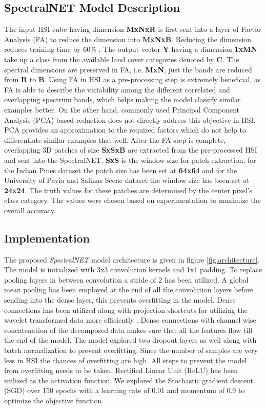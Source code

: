 \documentclass[journal]{IEEEtran}
\begin{document}
\subsection{SpectralNET Model Description}
The input HSI cube having dimension \textbf{MxNxR} is first sent into a layer of Factor Analysis (FA) to reduce the dimension into \textbf{MxNxB}. Reducing the dimension reduces training time by 60\% \cite{10.1007/978-3-030-14118-9_2}. The output vector \textbf{Y} having a dimension \textbf{1xMN} take up a class from the available land cover categories denoted by \textbf{C}. The spectral dimensions are preserved in FA, i.e. \textbf{MxN}, just the bands are reduced from \textbf{R} to \textbf{B}. Using FA in HSI as a pre-processing step is extremely beneficial, as FA is able to describe the variability among the different correlated and overlapping spectrum bands, which helps making the model classify similar examples better. On the other hand, commonly used Principal Component Analysis (PCA) based reduction does not directly address this objective in HSI. PCA provides an approximation to the required factors which do not help to differentiate similar examples that well. After the FA step is complete, overlapping 3D patches of size \textbf{SxSxB} are extracted from the pre-processed HSI and sent into the SpectralNET. \textbf{SxS} is the window size for patch extraction, for the Indian Pines dataset the patch size has been set at \textbf{64x64} and for the University of Pavia and Salinas Scene dataset the window size has been set at \textbf{24x24}. The truth values for these patches are determined by the center pixel's class category. The values were chosen based on experimentation to maximize the overall accuracy. 

\subsection{Implementation}
The proposed \textit{SpectralNET} model architecture is given in figure \ref{fig:architecture}. The model is initialized with 3x3 convolution kernels and 1x1 padding. To replace pooling layers in between convolution a stride of 2 has been utilized. A global mean pooling has been employed at the end of all the convolution layers before sending into the dense layer, this prevents overfitting in the model. Dense connections has been utilized along with projection shortcuts for utilizing the wavelet transformed data more efficiently \cite{he2016deep} \cite{huang2017densely}. Dense connections with channel wise concatenation of the decomposed data makes sure that all the features flow till the end of the model. The model explored two dropout layers as well along with batch normalization to prevent overfitting. Since the number of samples are very less in HSI the chances of overfitting are high. All steps to prevent the model from overfitting needs to be taken. Rectified Linear Unit (ReLU) has been utilized as the activation function. We explored the Stochastic gradient descent (SGD) over 150 epochs with a learning rate of 0.01 and momentum of 0.9 to optimize the objective function. 
\end{document}
